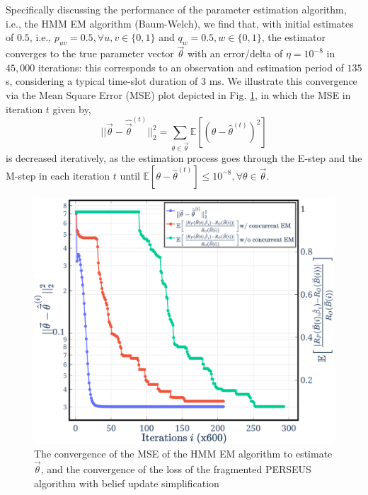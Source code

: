\documentclass[12pt, draftcls, onecolumn]{IEEEtran}
\begin{document}
Specifically discussing the performance of the parameter estimation algorithm, i.e., the HMM EM algorithm (Baum-Welch), we find that, with initial estimates of $0.5$, i.e., $p_{uv}{=}0.5,{\forall}u,v{\in}\{0,1\}$ and $q_{w}{=}0.5,w{\in}\{0,1\}$, the estimator converges to the true parameter vector $\vec{\theta}$ with an error/delta of $\eta{=}10^{-8}$ in $45,000$ iterations: this corresponds to an observation and estimation period of $135$ s, considering a typical time-slot duration of $3$ ms. We illustrate this convergence via the Mean Square Error (MSE) plot depicted in Fig. \ref{Fig. 7}, in which the MSE in iteration $t$ given by,
\begin{equation}\label{32}
    ||\vec{\theta}-\hat{\vec{\theta}}^{(t)}||_{2}^{2}=\sum_{\theta \in \vec{\theta}}\mathbb{E}[(\theta-\hat{\theta}^{(t)})^{2}]
\end{equation}
is decreased iteratively, as the estimation process goes through the E-step and the M-step in each iteration $t$ until $\mathbb{E}[\theta{-}\hat{\theta}^{(t)}]{\leq}10^{-8},{\forall}\theta{\in}\vec{\theta}$.
\begin{figure} [t]
    \centerline{
    \includegraphics[width = 1.0\linewidth]{figures/Minerva_Computational_Performance.png}}
    \vspace{-6mm}
    \caption{The convergence of the MSE of the HMM EM algorithm to estimate $\vec{\theta}$, and the convergence of the loss of the fragmented PERSEUS algorithm with belief update simplification}
    \vspace{-7mm}
    \label{Fig. 7}
\end{figure}
\end{document}
